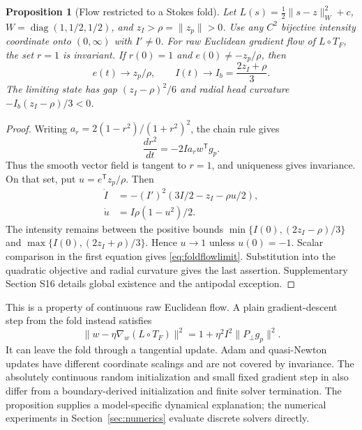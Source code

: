 \documentclass[10pt,a4paper]{article}
\newtheorem{proposition}[theorem]{Proposition}
\begin{document}
\begin{proposition}[Flow restricted to a Stokes fold]
\label{prop:restrictedflow}
Let $L(s)=\tfrac12\|s-z\|_W^2+c$, $W=\operatorname{diag}(1,1/2,1/2)$, and $z_I>\rho=\|z_p\|>0$. Use any $C^2$ bijective intensity coordinate onto $(0,\infty)$ with $I'\ne0$. For raw Euclidean gradient flow of $L\circ T_F$, the set $r=1$ is invariant. If $r(0)=1$ and $e(0)\ne-z_p/\rho$, then
\begin{equation}
 e(t)\longrightarrow z_p/\rho,\qquad
 I(t)\longrightarrow I_b=\frac{2z_I+\rho}{3}.
 \label{eq:foldflowlimit}
\end{equation}
The limiting state has gap $(z_I-\rho)^2/6$ and radial head curvature $-I_b(z_I-\rho)/3<0$.
\end{proposition}
\begin{proof}
Writing $a_r=2(1-r^2)/(1+r^2)^2$, the chain rule gives
\begin{equation}
 \frac{d r^2}{dt}=-2Ia_r w^{\mathsf T}g_p.
 \label{eq:radiusflow}
\end{equation}
Thus the smooth vector field is tangent to $r=1$, and uniqueness gives invariance. On that set, put $u=e^{\mathsf T}z_p/\rho$. Then
\begin{equation}
 \begin{aligned}
 \dot I&=-(I')^2(3I/2-z_I-\rho u/2),\\
 \dot u&=I\rho(1-u^2)/2.
 \end{aligned}
 \label{eq:restrictedflow}
\end{equation}
The intensity remains between the positive bounds $\min\{I(0),(2z_I-\rho)/3\}$ and $\max\{I(0),(2z_I+\rho)/3\}$. Hence $u\to1$ unless $u(0)=-1$. Scalar comparison in the first equation gives \eqref{eq:foldflowlimit}. Substitution into the quadratic objective and radial curvature gives the last assertion. Supplementary Section S16 details global existence and the antipodal exception.
\end{proof}

This is a property of continuous raw Euclidean flow. A plain gradient-descent step from the fold instead satisfies
\begin{equation}
 \|w-\eta\nabla_w(L\circ T_F)\|^2
 =1+\eta^2 I^2\|P_\perp g_p\|^2.
 \label{eq:discretefoldstep}
\end{equation}
It can leave the fold through a tangential update. Adam and quasi-Newton updates have different coordinate scalings and are not covered by invariance. The absolutely continuous random initialization and small fixed gradient step in \cite{lee} also differ from a boundary-derived initialization and finite solver termination. The proposition supplies a model-specific dynamical explanation; the numerical experiments in Section~\ref{sec:numerics} evaluate discrete solvers directly.
\end{document}
